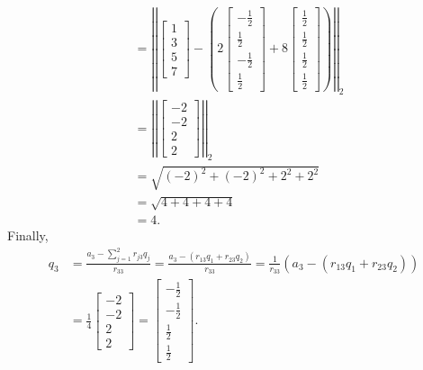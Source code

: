 \documentclass[letterpaper]{article}
\newcommand{\0}{\mathbf{0}}
\begin{document}
\begin{mdframed}
\begin{mdframed}
\begin{equation*}
\begin{aligned}
                    &= \left|\left| \begin{bmatrix}
                        1 \\ 3 \\ 5 \\ 7
                    \end{bmatrix} - \left(2 \begin{bmatrix}
                        -\frac{1}{2} \\ \frac{1}{2} \\ -\frac{1}{2} \\ \frac{1}{2}
                    \end{bmatrix} + 8 \begin{bmatrix}
                        \frac{1}{2} \\ \frac{1}{2} \\ \frac{1}{2} \\ \frac{1}{2}
                    \end{bmatrix}\right) \right|\right|_2 \\ 
                    &= \left|\left| \begin{bmatrix}
                        -2 \\ -2 \\ 2 \\ 2
                    \end{bmatrix} \right|\right|_2 \\ 
                    &= \sqrt{(-2)^2 + (-2)^2 + 2^2 + 2^2} \\ 
                    &= \sqrt{4 + 4 + 4 + 4} \\ 
                    &= 4.
            \end{aligned}
        \end{equation*}
        Finally,
        \begin{equation*}
            \begin{aligned}
                q_3 &= \frac{a_3 - \sum_{j = 1}^{2} r_{j3}q_j}{r_{33}} = \frac{a_3 - (r_{13}q_1 + r_{23}q_2)}{r_{33}} = \frac{1}{r_{33}} (a_3 - (r_{13}q_1 + r_{23}q_2)) \\ 
                    &= \frac{1}{4} \begin{bmatrix}
                        -2 \\ -2 \\ 2 \\ 2
                    \end{bmatrix} = \begin{bmatrix}
                        -\frac{1}{2} \\ -\frac{1}{2} \\ \frac{1}{2} \\ \frac{1}{2}
                    \end{bmatrix}.
            \end{aligned}
        \end{equation*}
    \end{mdframed}


\end{mdframed}
\end{document}
